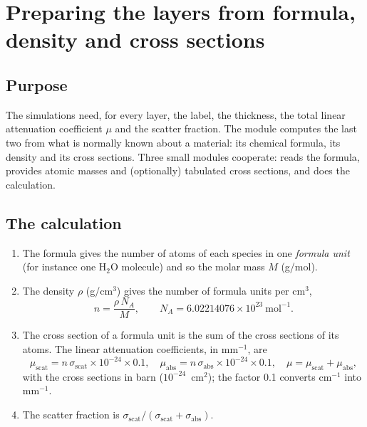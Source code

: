 \chapter{Preparing the layers from formula, density and cross sections}
\label{ch:builder}

\section{Purpose}

The simulations need, for every layer, the label, the thickness, the total linear attenuation coefficient $\mu$ and the scatter fraction. The module
 computes the last two from what is normally known about a material: its chemical formula, its density and its cross sections. Three small modules
cooperate:  reads the formula,  provides atomic masses and (optionally) tabulated cross sections, and
 does the calculation.

\section{The calculation}

\begin{enumerate}
  \item The formula gives the number of atoms of each species in one \emph{formula unit} (for instance one H$_2$O molecule) and so the molar mass $M$ (g/mol).
  \item The density $\rho$ (g/cm$^3$) gives the number of formula units per cm$^3$,
        \begin{equation} n=\frac{\rho\,N_A}{M},\qquad N_A=6.02214076\times10^{23}\ \mathrm{mol}^{-1}. \end{equation}
  \item The cross section of a formula unit is the sum of the cross sections of its atoms. The linear attenuation coefficients, in mm$^{-1}$, are
        \begin{equation}
          \mu_\mathrm{scat}=n\,\sigma_\mathrm{scat}\times10^{-24}\times0.1,\quad
          \mu_\mathrm{abs}=n\,\sigma_\mathrm{abs}\times10^{-24}\times0.1,\quad
          \mu=\mu_\mathrm{scat}+\mu_\mathrm{abs},
        \end{equation}
        with the cross sections in barn ($10^{-24}$~cm$^2$); the factor 0.1 converts cm$^{-1}$ into mm$^{-1}$.
  \item The scatter fraction is $\sigma_\mathrm{scat}/(\sigma_\mathrm{scat}+\sigma_\mathrm{abs})$.
\end{enumerate}

